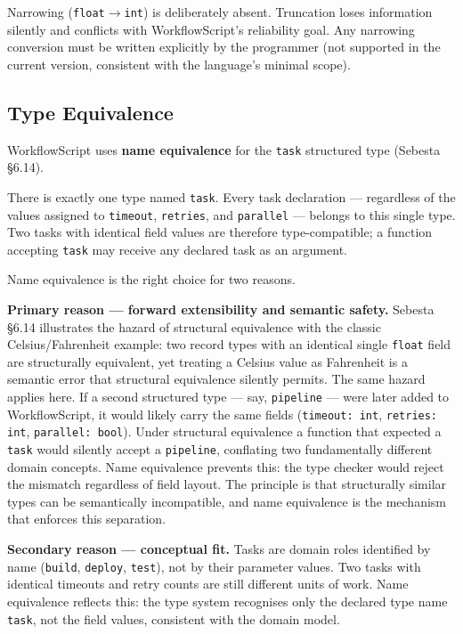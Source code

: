 \documentclass[10pt,a4paper]{article}
\begin{document}
Narrowing (\texttt{float}$\to$\texttt{int}) is deliberately absent. Truncation loses
information silently and conflicts with WorkflowScript's reliability goal. Any narrowing
conversion must be written explicitly by the programmer (not supported in the current version,
consistent with the language's minimal scope).

\subsection{Type Equivalence}

WorkflowScript uses \textbf{name equivalence} for the \texttt{task} structured type
(Sebesta \S6.14).

There is exactly one type named \texttt{task}. Every task declaration --- regardless of the
values assigned to \texttt{timeout}, \texttt{retries}, and \texttt{parallel} --- belongs to
this single type. Two tasks with identical field values are therefore type-compatible; a
function accepting \texttt{task} may receive any declared task as an argument.

Name equivalence is the right choice for two reasons.

\textbf{Primary reason --- forward extensibility and semantic safety.}
Sebesta \S6.14 illustrates the hazard of structural equivalence with the classic
Celsius/Fahrenheit example: two record types with an identical single \texttt{float} field
are structurally equivalent, yet treating a Celsius value as Fahrenheit is a semantic error
that structural equivalence silently permits. The same hazard applies here. If a second
structured type --- say, \texttt{pipeline} --- were later added to WorkflowScript, it would
likely carry the same fields (\texttt{timeout: int}, \texttt{retries: int},
\texttt{parallel: bool}). Under structural equivalence a function that expected a
\texttt{task} would silently accept a \texttt{pipeline}, conflating two fundamentally
different domain concepts. Name equivalence prevents this: the type checker would reject the
mismatch regardless of field layout. The principle is that structurally similar types can be
semantically incompatible, and name equivalence is the mechanism that enforces this separation.

\textbf{Secondary reason --- conceptual fit.}
Tasks are domain roles identified by name (\texttt{build}, \texttt{deploy}, \texttt{test}),
not by their parameter values. Two tasks with identical timeouts and retry counts are still
different units of work. Name equivalence reflects this: the type system recognises only the
declared type name \texttt{task}, not the field values, consistent with the domain model.
\end{document}
